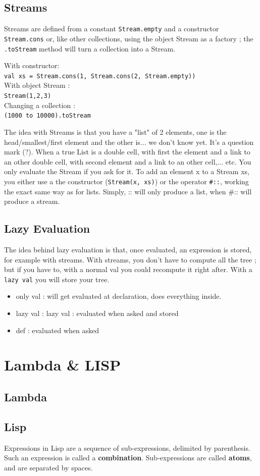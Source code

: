 \documentclass[12pt,a4paper]{article}
\begin{document}
\subsection{Streams}
Streams are defined from a constant \texttt{Stream.empty} and a constructor \texttt{Stream.cons} or, like other collections, using the object Stream as a factory ; the \texttt{.toStream} method will turn a collection into a Stream.
\begin{exemple}
	With constructor:\\
	\texttt{val xs = Stream.cons(1, Stream.cons(2, Stream.empty))}\\
	With object Stream :\\
	\texttt{Stream(1,2,3)}\\
	Changing a collection :\\
	\texttt{(1000 to 10000).toStream}
\end{exemple}
The idea with Streams is that you have a "list" of 2 elements, one is the head/smallest/first element and the other is... we don't know yet. It's a question mark (?). When a true List is a double cell, with first the element and a link to an other double cell, with second element and a link to an other cell,... etc. You only evaluate the Stream if you ask for it.
 To add an element x to a Stream xs, you either use a the constructor (\texttt{Stream(x, xs)}) or the operator \texttt{\#::}, working the exact same way as for lists. Simply, :: will only produce a list, when \#:: will produce a stream.

\subsection{Lazy Evaluation}
The idea behind lazy evaluation is that, once evaluated, an expression is stored, for example with streams. With streams, you don't have to compute all the tree ; but if you have to, with a normal val you could recompute it right after. With a \texttt{lazy val} you will store your tree.
\begin{itemize}
	\item	only val : will get evaluated at declaration, does everything inside.
	\item 	lazy val : lazy val : evaluated when asked and stored
	\item 	def : evaluated when asked
	
\end{itemize}

\section{Lambda \& LISP}
\subsection{Lambda}

\subsection{Lisp}
Expressions in Lisp are a sequence of sub-expressions, delimited by parenthesis. Such an expression is called a \textbf{combination}. Sub-expressions are called \textbf{atoms}, and are separated by spaces.
\end{document}
